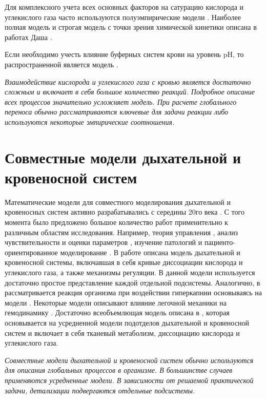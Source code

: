 Для комплексного учета всех основных факторов на сатурацию кислорода и углекислого газа часто используются полуэмпирические модели \cite{Christensen1996,Siggaard1984,Christensen2004}. Наиболее полная модель и строгая модель с точки зрения химической кинетики описана в работах Даша \cite{Dash2010}.  

Если необходимо учесть влияние буферных систем крови на уровень pH, то распространенной является модель \cite{Chiari1994}.

\textit{Взаимодействие кислорода и углекислого газа с кровью является достаточно сложным и включает в себя большое количество реакций. Подробное описание всех процессов значительно усложняет модель. При расчете глобального переноса обычно рассматриваются ключевые для задачи реакции либо используются некоторые эмпирические соотношения.}

\section{Совместные модели дыхательной и кровеносной систем}
Математические модели для совместного моделирования дыхательной и кровеносных систем активно разрабатывались с середины 20го века \cite{GuytonColeman1972,Grodins1967}. С того момента было предложено большое количество работ применительно к различным областям исследования. Например, теория управления \cite{Grodins1967,Gray1946,Reyes2014,Mauro1998,Ursino1994,Batzel2007,Ottesen2004,Chiari1997,Magosso2001}, анализ чувствительности и оценки параметров  \cite{Batzel2010,Fink2008,Kappel2006}, изучение патологий  \cite{Khoo2008} и пациенто-ориентированное моделирование \cite{Ottesen2014,Ellwein2013,Williams2013}. В работе \cite{Ursino2001} описана модель дыхательной и кровеносной системы, включавшая в себя кривые диссоциации кислорода и углекислого газа, а также механизмы регуляции. В данной модели используется достаточно простое представление каждой отдельной подсистемы. Аналогично, в \cite{Batzel2011} рассматривается реакция организма при воздействии гиперкапнии основываясь на модели \cite{Ellwein2013,Olufsen2013}. Некоторые модели описывают влияние легочной механики на гемодинамику \cite{Hardy1982,Lu2001,Hemalatha2010}. Достаточно всеобъемлющая модель описана в \cite{Blanco2016}, которая основывается на усредненной модели подотделов дыхательной и кровеносной систем и включает в себя тканевый метаболизм, диссоциацию кислорода и углекислого газа.

\textit{Совместные модели дыхательной и кровеносной систем обычно используются для описания глобальных процессов в организме. В большинстве случаев применяются усредненные модели. В зависимости от решаемой практической задачи, детализации подвергаются отдельные подсистемы.}

